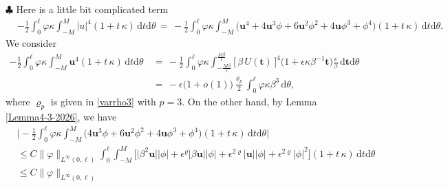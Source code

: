 \documentclass[10pt, reqno]{amsart}
\numberwithin{equation}{section}
\theoremstyle{definition}
\newcommand{\e}{\epsilon}
\begin{document}
{{\medskip
\noindent$\clubsuit$
 Here is a little bit complicated term
\begin{align*}
 &-\frac{1}{2}\int_0^\ell \varphi\kappa \int_{-M}^{M} |u|^4 (1+t\,\kappa)\,{\mathrm d}t{\mathrm d}\theta
\,=\,-\frac{1}{2}\int_0^\ell \varphi\kappa \int_{-M}^{M}
 \big({\mathbf u}^4 +4{\mathbf u}^3\phi +6{\mathbf u}^2\phi^2 +4{\mathbf u}\phi^3 +\phi^4\big)
 (1+t\,\kappa)\,{\mathrm d}t{\mathrm d}\theta.
\end{align*}
 We consider
\begin{align*}
 -\frac{1}{2}\int_0^\ell \varphi\kappa \int_{-M}^{M} {\mathbf u}^4 (1+t\,\kappa)\,{\mathrm d}t{\mathrm d}\theta
 &\,=\,
 -\frac{1}{2}\int_0^\ell \varphi\kappa \int_{-\frac{M\beta}{\epsilon}}^{\frac{M\beta}{\epsilon}}
 \big[\,\beta\, U({\mathbf t})\, \big]^4\big(1+\epsilon \kappa \beta^{-1}{\mathbf t}\big)
 \frac{\epsilon}{\beta}
 \,{\mathrm d}{\mathbf t}{\mathrm d}\theta
\nonumber\\[2mm]
 & \,=\,
 -\epsilon\big(1+o(1)\big)\frac{\varrho_p}{2} \int_0^\ell \varphi \kappa\beta^3 \,{\mathrm d}\theta,
\end{align*}
 where $\varrho_p$ is given in \eqref{varrho3} with $p=3$.
 On the other hand, by Lemma \ref{Lemma4-3-2026}, we have
\begin{align*}
 &\Bigg|-\frac{1}{2}\int_0^\ell \varphi\kappa \int_{-M}^{M}
 \big(4{\mathbf u}^3\phi +6{\mathbf u}^2\phi^2 +4{\mathbf u}\phi^3 +\phi^4\big)
 (1+t\,\kappa)\,{\mathrm d}t{\mathrm d}\theta
 \Bigg|
\nonumber\\[2mm]
 &\le  C\|\varphi\|_{L^\infty(0,\ell)}\int_0^\ell \int_{-M}^{M}
 \Big[\big|\beta^2{\mathbf u}\big| \big|\phi \big| +\e^{\varrho} \big|\beta{\mathbf u}\big| \big|\phi \big| + \e^{2\varrho} \big|{\mathbf u}\big| \big|\phi \big|+ \e^{2\varrho}  \big|\phi \big|^2\Big]
 (1+t\,\kappa)\,{\mathrm d}t{\mathrm d}\theta
\nonumber\\[2mm]
 &\leq
 C\|\varphi\|_{L^\infty(0,\ell)}

\end{align*}}}
\end{document}
